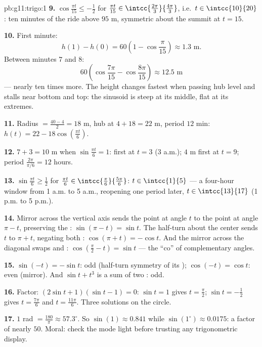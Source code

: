 \begin{solution}{pb:g11:trigo:1}
\textbf{9.} $\cos\frac{\pi t}{15} \leq -\frac12$ for
$\frac{\pi t}{15} \in \intcc{\frac{2\pi}{3}}{\frac{4\pi}{3}}$,
i.e.\ $t \in \intcc{10}{20}$: ten minutes of the ride above
$95$ m, symmetric about the summit at $t = 15$.

\textbf{10.} First minute:
\[
h(1) - h(0) = 60\left(1 - \cos\frac{\pi}{15}\right)
\approx 1.3 \text{ m}.
\]
Between minutes $7$ and $8$:
\[
60\left(\cos\frac{7\pi}{15} - \cos\frac{8\pi}{15}\right)
\approx 12.5 \text{ m}
\]
--- nearly ten times more. The height changes fastest when passing hub level
and stalls near bottom and top: the sinusoid is steep at its
middle, flat at its extremes.

\textbf{11.} Radius $= \frac{40 - 4}{2} = 18$ m, hub at
$4 + 18 = 22$ m, period $12$ min:
$h(t) = 22 - 18\cos\left(\frac{\pi t}{6}\right)$.

\textbf{12.}  $7 + 3 = 10$ m when
$\sin\frac{\pi t}{6} = 1$: first at $t = 3$ (3 a.m.);
 $4$ m first at $t = 9$; period
$\frac{2\pi}{\pi/6} = 12$ hours.

\textbf{13.} $\sin\frac{\pi t}{6} \geq \frac12$ for
$\frac{\pi t}{6} \in \intcc{\frac\pi6}{\frac{5\pi}{6}}$:
$t \in \intcc{1}{5}$ --- a four-hour window from 1 a.m. to 5
a.m., reopening one period later, $t \in \intcc{13}{17}$
(1 p.m. to 5 p.m.).

\textbf{14.} Mirror across the vertical axis sends the point at
angle $t$ to the point at angle $\pi - t$, preserving the
: $\sin(\pi - t) = \sin t$. The half-turn about the
center sends $t$ to $\pi + t$, negating both :
$\cos(\pi + t) = -\cos t$. And the mirror across the diagonal
swaps  and :
$\cos\left(\frac\pi2 - t\right) = \sin t$ --- the
``co'' of complementary angles.

\textbf{15.} $\sin(-t) = -\sin t$: odd (half-turn symmetry of
its ); $\cos(-t) = \cos t$: even (mirror). And
$\sin t + t^3$ is a sum of two : odd.

\textbf{16.} Factor: $(2\sin t + 1)(\sin t - 1) = 0$:
$\sin t = 1$ gives $t = \frac\pi2$;
$\sin t = -\frac12$ gives $t = \frac{7\pi}{6}$ and
$t = \frac{11\pi}{6}$. Three solutions on the circle.

\textbf{17.} $1$ rad $= \frac{180}{\pi} \approx 57.3^\circ$.
So $\sin(1) \approx 0.841$ while $\sin(1^\circ) \approx
0.0175$: a factor of nearly $50$. Moral: check the mode light
before trusting any trigonometric display.


\end{solution}
